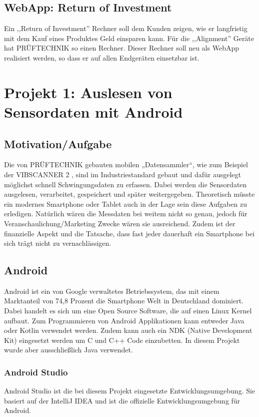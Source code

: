 \documentclass{article}
\begin{document}
{	\subsection{WebApp: Return of Investment} 

		Ein ,,Return of Investment'' Rechner soll dem Kunden zeigen, wie er langfristig mit dem Kauf eines Produktes Geld einsparen kann. Für die ,,Alignment'' Geräte hat PRÜFTECHNIK so einen Rechner. Dieser Rechner soll neu als WebApp realisiert werden, so dass er auf allen Endgeräten einsetzbar ist.



\section{Projekt 1: Auslesen von Sensordaten mit Android} 
	\subsection{Motivation/Aufgabe}
		Die von PRÜFTECHNIK gebauten mobilen „Datensammler“, wie zum Beispiel der VIBSCANNER 2 , sind im Industriestandard gebaut und dafür ausgelegt möglichst schnell Schwingungsdaten zu erfassen. Dabei werden die Sensordaten ausgelesen, verarbeitet, gespeichert und später weitergegeben.
		Theoretisch müsste ein modernes Smartphone oder Tablet auch in der Lage sein diese Aufgaben zu erledigen.
		Natürlich wären die Messdaten bei weitem nicht so genau, jedoch für Veranschaulichung/Marketing Zwecke wären sie ausreichend. Zudem ist der finanzielle Aspekt und die Tatsache, dass fast jeder dauerhaft ein Smartphone bei sich trägt nicht zu vernachlässigen.

	\subsection{Android}
		Android ist ein von Google verwaltetes Betriebssystem, das mit einem Marktanteil von 74,8 Prozent die Smartphone Welt in Deutschland dominiert. Dabei handelt es sich um eine Open Source Software, die auf einen Linux Kernel aufbaut. Zum Programmieren von Android Applikationen kann entweder Java oder Kotlin verwendet werden. Zudem kann auch ein NDK (Native Development Kit) eingesetzt werden um C und C++ Code einzubetten. In diesem Projekt wurde aber ausschließlich Java verwendet.

		\subsubsection{Android Studio}
			Android Studio ist die bei diesem Projekt eingesetzte Entwicklungsumgebung. Sie basiert auf der IntelliJ IDEA und ist die offizielle Entwicklungsumgebung für Android.

}
\end{document}
